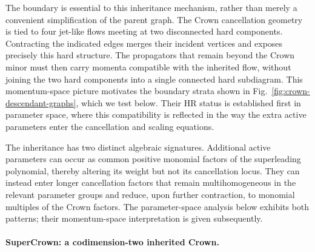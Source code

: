 \documentclass[a4paper,11pt]{article}
\begin{document}
The boundary is essential to this inheritance mechanism, rather than merely
a convenient simplification of the parent graph.  The Crown cancellation
geometry is tied to four jet-like flows meeting at two disconnected hard
components.  Contracting the indicated edges merges their incident vertices and
exposes precisely this hard structure.  The propagators that remain beyond
the Crown minor must then carry momenta compatible with
the inherited flow,
without joining the two hard components into a single connected hard
subdiagram.  This momentum-space picture motivates the boundary strata shown
in Fig.~\ref{fig:crown-descendant-graphs}, which we test below.  Their HR status is
established first in parameter space, where this
compatibility is reflected in the way the extra active parameters enter the
cancellation and scaling equations.

The inheritance has two distinct algebraic signatures.  Additional active
parameters can occur as common positive monomial factors of the superleading
polynomial, thereby altering its weight but not its cancellation locus.  They
can instead enter longer cancellation factors that remain multihomogeneous in
the relevant parameter groups and reduce, upon further contraction, to
monomial multiples of the Crown factors.  The parameter-space analysis below
exhibits both patterns; their momentum-space interpretation is given
subsequently.

\paragraph{SuperCrown: a codimension-two inherited Crown.}
\end{document}
